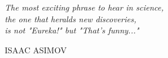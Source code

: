\cleardoublepage


\thispagestyle{empty}
\null\vfill

\begin{center}
\parbox{9cm}{%
\raggedright{\Large\itshape%
The most exciting phrase to hear in science,\\
the one that heralds new discoveries,\\
is not "Eureka!" but "That's funny..."\par\bigskip
}
\raggedleft\large\MakeUppercase{Isaac Asimov}\par%
}
\end{center}
\vfill\vfill







